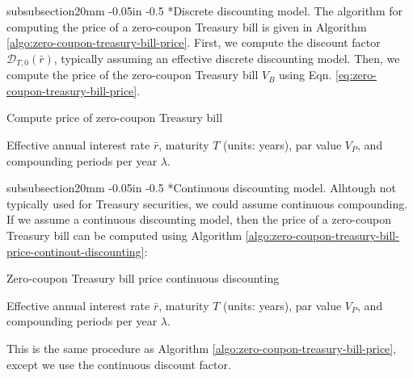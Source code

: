 \documentclass[11pt]{article}
\makeatletter
\theoremstyle{definition}
\renewcommand\subsubsection{\@startsection
	{subsubsection}{2}{0mm}
	{-0.05in}
	{-0.5\baselineskip}
	{\normalfont\normalsize\itshape\bfseries}}
\makeatother
\begin{document}
\subsubsection*{Discrete discounting model.}
The algorithm for computing the price of a zero-coupon Treasury bill is given in Algorithm \ref{algo:zero-coupon-treasury-bill-price}.
First, we compute the discount factor $\mathcal{D}_{T,0}(\bar{r})$, typically assuming an effective discrete discounting model.
Then, we compute the price of the zero-coupon Treasury bill $V_{B}$ using Eqn. \eqref{eq:zero-coupon-treasury-bill-price}.
\begin{algorithm}[h]
    \caption{Compute price of zero-coupon Treasury bill}\label{algo:zero-coupon-treasury-bill-price}
    \begin{algorithmic}[1]
		\Require Effective annual interest rate $\bar{r}$, maturity $T$ (units: years), par value $V_{P}$, and compounding periods per year $\lambda$.

		\Statex
	\end{algorithmic}
\end{algorithm}

\subsubsection*{Continuous discounting model.}
Alhtough not typically used for Treasury securities, we could assume continuous compounding. 
If we assume a continuous discounting model, then the price of a zero-coupon Treasury bill can be computed using Algorithm \ref{algo:zero-coupon-treasury-bill-price-continout-discounting}:
\begin{algorithm}[h]
    \caption{Zero-coupon Treasury bill price continuous discounting}\label{algo:zero-coupon-treasury-bill-price-continout-discounting}
    \begin{algorithmic}[1]
		\Require Effective annual interest rate $\bar{r}$, maturity $T$ (units: years), par value $V_{P}$, and compounding periods per year $\lambda$.

		\Statex
	\end{algorithmic}
\end{algorithm}
This is the same procedure as Algorithm \ref{algo:zero-coupon-treasury-bill-price}, except we use the continuous discount factor.
\end{document}

